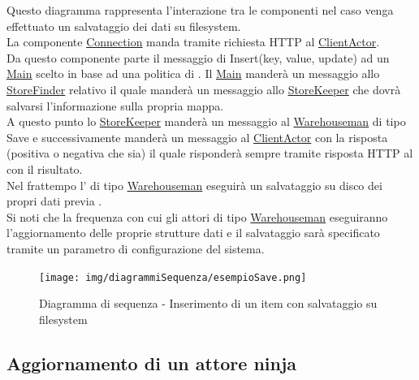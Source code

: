 \documentclass{scalatekids-article}
\begin{document}
Questo diagramma rappresenta l'interazione tra le componenti nel caso venga
effettuato un salvataggio dei dati su filesystem.\\
La componente \hyperref[sec:actorbase::driver::client::Connection]{Connection}
manda tramite richiesta HTTP al \hyperref[sec:actorbase::actorsystem::actors::clientactor::ClientActor]{ClientActor}.\\
Da questo componente parte il messaggio di Insert(key, value, update) ad un \hyperref[sec:actorbase::actorsystem::actors::main::Main]{Main} scelto in base ad una
politica di . Il \hyperref[sec:actorbase::actorsystem::actors::main::Main]{Main} manderà un messaggio allo
\hyperref[sec:actorbase::actorsystem::actors::storefinder::StoreFinder]{StoreFinder} relativo il quale manderà un messaggio
allo \hyperref[sec:actorbase::actorsystem::actors::storekeeper::StoreKeeper]{StoreKeeper} che dovrà salvarsi l'informazione sulla propria mappa.\\
A questo punto lo \hyperref[sec:actorbase::actorsystem::actors::storekeeper::StoreKeeper]{StoreKeeper} manderà un messaggio al
\hyperref[sec:actorbase::actorsystem::actors::warehouseman::Warehouseman]{Warehouseman} di tipo Save e
successivamente manderà un messaggio al \hyperref[sec:actorbase::actorsystem::actors::clientactor::ClientActor]{ClientActor} con la risposta
(positiva o negativa che sia) il quale risponderà sempre tramite risposta HTTP al  con il risultato.\\
Nel frattempo l' di tipo \hyperref[sec:actorbase::actorsystem::actors::warehouseman::Warehouseman]{Warehouseman} eseguirà un salvataggio
su disco dei propri dati previa .\\
Si noti che la frequenza con cui gli attori di tipo \hyperref[sec:actorbase::actorsystem::actors::warehouseman::Warehouseman]{Warehouseman} eseguiranno
l'aggiornamento delle proprie strutture dati e il salvataggio sarà specificato
tramite un parametro di configurazione del sistema.\\
\begin{figure}[H]
  \begin{center}
    \texttt{[image: img/diagrammiSequenza/esempioSave.png]}
    \caption{Diagramma di sequenza - Inserimento di un item con salvataggio su filesystem}
  \end{center}
\end{figure}

\subsection{Aggiornamento di un attore ninja}
\end{document}
